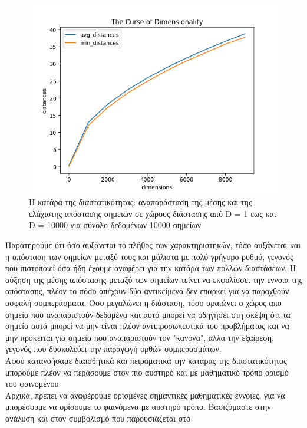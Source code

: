 \documentclass[12pt]{article}
\newenvironment{matlab}
	{\begin{figure}[H]\centering\captionsetup{justification=centering}}
	{\end{figure}}
\begin{document}
\begin{matlab}
	\includegraphics[scale=0.8]{images/the_curse_of_dimensionality_1_to_10000.png}
	\caption{Η κατάρα της διαστατικότητας: αναπαράσταση της μέσης και της ελάχιστης απόστασης σημειών σε χώρους διάστασης από D = 1 εως και D = 10000 για σύνολο δεδομένων 10000 σημείων}
\end{matlab}

Παρατηρούμε ότι όσο αυξάνεται το πλήθος των χαρακτηριστηκών, τόσο αυξάνεται και η απόσταση των σημείων μεταξύ τους και μάλιστα με πολύ γρήγορο ρυθμό, γεγονός που πιστοποιεί όσα ήδη έχουμε αναφέρει για την κατάρα των πολλών διαστάσεων. Η αύξηση της μέσης απόστασης μεταξύ των σημείων τείνει να εκφυλίσσει την εννοια της απόστασης, πλέον το πόσο απέχουν δύο αντικείμενα δεν επαρκεί για να παραχθούν ασφαλή συμπεράσματα. Όσο μεγαλώνει η διάσταση, τόσο αραιώνει ο χώρος απο σημεία που αναπαριστούν δεδομένα και αυτό μπορεί να οδηγήσει στη σκέψη ότι τα σημεία αυτά μπορεί να μην είναι πλέον αντιπροσωπευτικά του προβλήματος και να μην πρόκειται για σημεία που αναπαριστούν τον "κανόνα", αλλά την εξαίρεση, γεγονός που δυσκολεύει την παραγωγή ορθών συμπερασμάτων. \\

Αφού κατανοήσαμε διαισθητικά και πειραματικά την κατάρας της διαστατικότητας μπορούμε πλέον να περάσουμε στον πιο αυστηρό και με μαθηματικό τρόπο ορισμό του φαινομένου. \\

Αρχικά, πρέπει να αναφέρουμε ορισμένες σημαντικές μαθηματικές έννοιες, για να μπορέσουμε να ορίσουμε το φαινόμενο με αυστηρό τρόπο. Βασιζόμαστε στην ανάλυση και στον συμβολισμό που παρουσιάζεται στο \cite{machinelearning} \\
\end{document}
